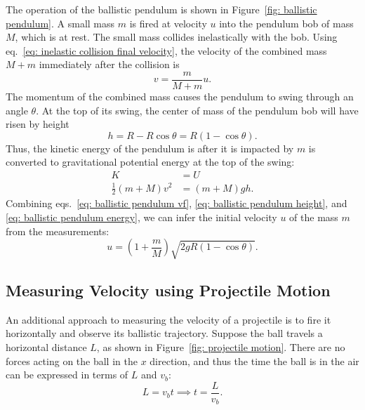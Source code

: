 \documentclass[addpoints]{physlabs}
\begin{document}
\begin{labsection}
\begin{theory}
    The operation of the ballistic pendulum is shown in Figure~\ref{fig: ballistic pendulum}. A small mass $m$ is fired at velocity $u$ into the pendulum bob of mass $M$, which is at rest. The small mass collides inelastically with the bob. Using eq.~\ref{eq: inelastic collision final velocity}, the velocity of the combined mass $M+m$ immediately after the collision is
    \begin{equation}\label{eq: ballistic pendulum vf}
        v = \frac{m}{M+m}u.
    \end{equation}
    The momentum of the combined mass causes the pendulum to swing through an angle $\theta$. At the top of its swing, the center of mass of the pendulum bob will have risen by height
    \begin{equation}\label{eq: ballistic pendulum height}
        h = R - R\cos{\theta} = R(1 - \cos{\theta}).
    \end{equation}
    Thus, the kinetic energy of the pendulum is after it is impacted by $m$ is converted to gravitational potential energy at the top of the swing:
    \begin{align}
        K &= U \nonumber
        \\
        \frac{1}{2}(m+M)v^2 &= (m+M)gh. \label{eq: ballistic pendulum energy} 
    \end{align}
    Combining eqs.~\ref{eq: ballistic pendulum vf}, \ref{eq: ballistic pendulum height}, and \ref{eq: ballistic pendulum energy}, we can infer the initial velocity $u$ of the mass $m$ from the measurements:
    \begin{equation}\label{eq: ballistic pendulum vi}
        u = \left(1 + \frac{m}{M}\right)\sqrt{2gR(1-\cos{\theta})}.
    \end{equation}

    \subsection*{Measuring Velocity using Projectile Motion}

    An additional approach to measuring the velocity of a projectile is to fire it horizontally and observe its ballistic trajectory. Suppose the ball travels a horizontal distance $L$, as shown in Figure~\ref{fig: projectile motion}. There are no forces acting on the ball in the $x$ direction, and thus the time the ball is in the air can be expressed in terms of $L$ and $v_b$:
    \begin{equation}\label{eq: }
        L = v_b t \implies t = \frac{L}{v_b}.
    \end{equation}


\end{theory}
\end{labsection}
\end{document}
